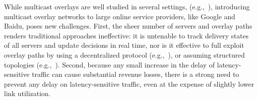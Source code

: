 While multicast overlays are well studied in several settings,
(e.g.,~\cite{??,??,??,??}), introducing multicast overlay networks 
to large online  service providers, 
like Google and Baidu, poses new challenges.
First, the sheer number of servers and overlay paths renders 
traditional approaches ineffective: it is untenable 
to track delivery states of all servers and update 
decisions in real time, nor is it effective to full exploit 
overlay paths by using a decentralized protocol 
(e.g.,~\cite{??,??}), 
or assuming structured topologies (e.g.,~\cite{akamai}).
Second, because any small increase in the delay of
latency-sensitive traffic can cause substantial revenue losses, 
there is a strong need to prevent any delay on
latency-sensitive traffic, even at the expense of slightly lower 
link utilization.





